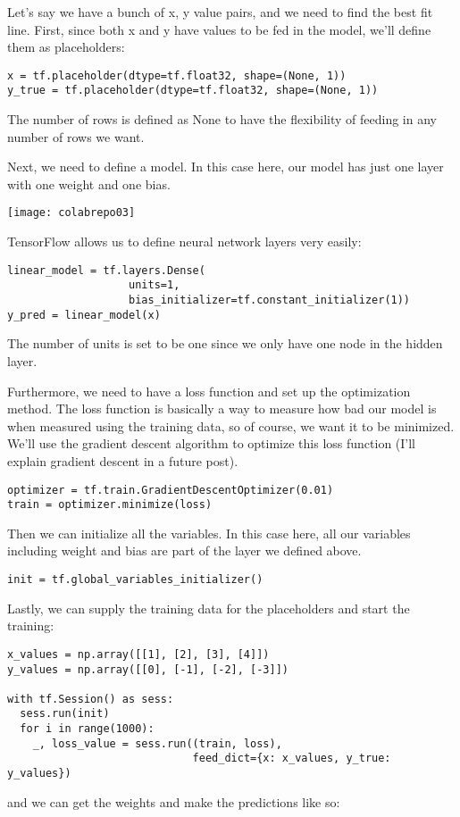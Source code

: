 Let's say we have a bunch of x, y value pairs, and we need to find the best fit line. First, since both x and y have values to be fed in the model, we'll define them as placeholders:

\begin{lstlisting}
x = tf.placeholder(dtype=tf.float32, shape=(None, 1))
y_true = tf.placeholder(dtype=tf.float32, shape=(None, 1))
\end{lstlisting}
The number of rows is defined as None to have the flexibility of feeding in any number of rows we want.

Next, we need to define a model. In this case here, our model has just one layer with one weight and one bias.

\begin{marginfigure}
\texttt{[image: colabrepo03]}
\end{marginfigure}


TensorFlow allows us to define neural network layers very easily:

\begin{lstlisting}
linear_model = tf.layers.Dense(
                   units=1, 
                   bias_initializer=tf.constant_initializer(1))
y_pred = linear_model(x)
\end{lstlisting}
The number of units is set to be one since we only have one node in the hidden layer.

Furthermore, we need to have a loss function and set up the optimization method. The loss function is basically a way to measure how bad our model is when measured using the training data, so of course, we want it to be minimized. We'll use the gradient descent algorithm to optimize this loss function (I'll explain gradient descent in a future post).

\begin{lstlisting}
optimizer = tf.train.GradientDescentOptimizer(0.01)
train = optimizer.minimize(loss)
\end{lstlisting}
Then we can initialize all the variables. In this case here, all our variables including weight and bias are part of the layer we defined above.

\begin{lstlisting}
init = tf.global_variables_initializer()
\end{lstlisting}
Lastly, we can supply the training data for the placeholders and start the training:

\begin{lstlisting}
x_values = np.array([[1], [2], [3], [4]])
y_values = np.array([[0], [-1], [-2], [-3]])

with tf.Session() as sess:
  sess.run(init)
  for i in range(1000):
    _, loss_value = sess.run((train, loss),
                             feed_dict={x: x_values, y_true: y_values})
\end{lstlisting}
and we can get the weights and make the predictions like so:

